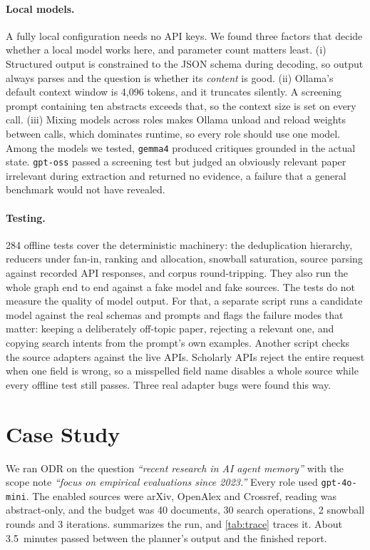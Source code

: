 \documentclass{article}
\newcommand{\code}[1]{\texttt{#1}}
\newcommand{\sys}{ODR}
\begin{document}
\paragraph{Local models.} A fully local configuration needs no API keys.
We found three factors that decide whether a local model works here, and
parameter count matters least. (i) Structured output is constrained to the
JSON schema during decoding, so output always parses and the question is
whether its \emph{content} is good. (ii) Ollama's default context window
is 4{,}096 tokens, and it truncates silently. A screening prompt containing
ten abstracts exceeds that, so the context size is set on every call. (iii)
Mixing models across roles makes Ollama unload and reload weights between
calls, which dominates runtime, so every role should use one model.
Among the models we tested, \code{gemma4} produced critiques grounded in
the actual state. \code{gpt-oss} passed a screening test but judged an
obviously relevant paper irrelevant during extraction and returned no
evidence, a failure that a general benchmark would not have revealed.

\paragraph{Testing.} 284 offline tests cover the deterministic machinery:
the deduplication hierarchy, reducers under fan-in, ranking and allocation,
snowball saturation, source parsing against recorded API responses, and
corpus round-tripping. They also run the whole graph end to end against a
fake model and fake sources. The tests do not measure the quality of model
output. For that, a separate script runs a candidate model against the
real schemas and prompts and flags the failure modes that matter: keeping
a deliberately off-topic paper, rejecting a relevant one, and copying
search intents from the prompt's own examples. Another script checks the
source adapters against the live APIs. Scholarly APIs reject the entire
request when one field is wrong, so a misspelled field name disables a
whole source while every offline test still passes. Three real adapter
bugs were found this way.

\section{Case Study}
\label{sec:case}

We ran \sys{} on the question \emph{``recent research in AI agent memory''}
with the scope note \emph{``focus on empirical evaluations since 2023.''}
Every role used \code{gpt-4o-mini}. The enabled sources were arXiv,
OpenAlex and Crossref, reading was abstract-only, and the budget was 40
documents, 30 search operations, 2 snowball rounds and 3 iterations.
 summarizes the run, and \cref{tab:trace} traces it. About
3.5~minutes passed between the planner's output and the finished report.
\end{document}
